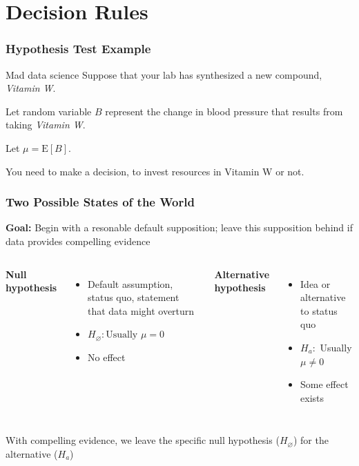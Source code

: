 \documentclass[12pt, block=fill]{beamer}
\newcommand{\E}{\text{E}}
\begin{document}











\section{Decision Rules}

\begin{frame}
  \frametitle{Hypothesis Test Example}

  \begin{exampleblock}{Mad data science}
    Suppose that your lab has synthesized a new compound, 
    \textit{Vitamin W}.

    Let random variable $B$ represent the change in blood pressure that results from taking
    \textit{Vitamin W}.
    
    Let $\mu = \E[B]$.

    You need to make a decision, to invest resources in Vitamin W or not. 
  \end{exampleblock}
  
   
 \end{frame}

\begin{frame}
  \frametitle{Two Possible States of the World}
  \textbf{Goal:} Begin with a resonable default supposition; leave
  this supposition behind if data provides compelling evidence
  \begin{columns}[t]
    \textbf{Null hypothesis}
    \begin{itemize}
    \item Default assumption, status quo, statement that data might overturn
    \item  $H_\varnothing: \text{Usually } \mu=0$
    \item No effect
    \end{itemize}
    \textbf{Alternative hypothesis}
    \begin{itemize}
    \item Idea or alternative to status quo
    \item $H_a:$ Usually  $\mu \neq 0$
    \item Some effect exists
    \end{itemize}
  \end{columns}
  
  With compelling evidence, we leave the specific null hypothesis
  ($H_{\varnothing}$) for the alternative ($H_{a}$)
\end{frame}
\end{document}

